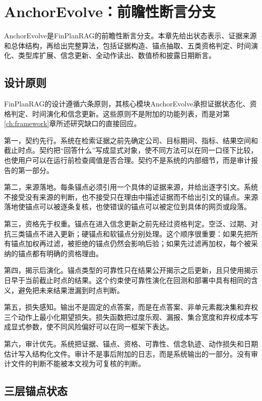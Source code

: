 \chapter{AnchorEvolve：前瞻性断言分支}
\label{ch:anchor}

AnchorEvolve是FinPlanRAG的前瞻性断言分支。本章先给出状态表示、证据来源和总体结构，再给出完整算法，包括证据构造、锚点抽取、五类资格判定、时间演化、类型库扩展、信念更新、全动作读出、数值桥和披露日期断言。


\section{设计原则}

FinPlanRAG的设计遵循六条原则，其核心模块AnchorEvolve承担证据状态化、资格判定、时间演化和信念更新。这些原则不是附加的功能列表，而是对第\ref{ch:framework}章所述研究缺口的直接回应。

第一，契约先行。系统在检索证据之前先确定公司、目标期间、指标、结果空间和截止时点。契约把“回答什么”写成显式对象，使不同方法可以在同一口径下比较，也使用户可以在运行前检查阈值是否合理。契约不是系统的内部细节，而是审计报告的第一部分。

第二，来源落地。每条锚点必须引用一个具体的证据来源，并给出逐字引文。系统不接受没有来源的判断，也不接受只在理由中描述证据而不给出引文的锚点。来源落地使锚点可以被逐条复核，也使错误的锚点可以被定位到具体的网页或段落。

第三，资格先于权重。锚点在进入信念更新之前先经过资格判定。空泛、过期、对抗三类锚点不进入更新；硬锚点和软锚点分别处理。这个顺序很重要：如果先把所有锚点加权再过滤，被拒绝的锚点仍然会影响后验；如果先过滤再加权，每个被采纳的锚点都有明确的资格理由。

第四，揭示后演化。锚点类型的可靠性只在结果公开揭示之后更新，且只使用揭示日早于当前截止时点的结果。这个约束使可靠性演化在回测和部署中具有相同的含义，避免把未来结果泄漏到时点判断。

第五，损失感知。输出不是固定的点答案，而是在点答案、非单元素裁决集和弃权三个动作上最小化期望损失。损失函数把过度乐观、漏报、集合宽度和弃权成本写成显式参数，使不同风险偏好可以在同一框架下表达。

第六，审计优先。系统把证据、锚点、资格、可靠性、信念轨迹、动作损失和日期估计写入结构化文件。审计不是事后附加的日志，而是系统输出的一部分。没有审计文件的判断不能被本文视为可复核的判断。

\section{三层锚点状态}

